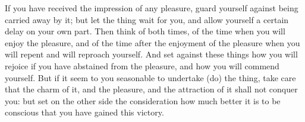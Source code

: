 If you  have received the  impression of  any pleasure, guard  yourself against
being carried away by it; but let the  thing wait for you, and allow yourself a
certain delay on your own part. Then think  of both times, of the time when you
will enjoy the  pleasure, and of the  time after the enjoyment  of the pleasure
when you will  repent and will reproach yourself. And  set against these things
how you will rejoice if you have  abstained from the pleasure, and how you will
commend yourself. But if it seem to you seasonable to undertake (do) the thing,
take care  that the charm  of it,  and the pleasure,  and the attraction  of it
shall not  conquer you: but  set on the other  side the consideration  how much
better it is to be conscious that you have gained this victory.
